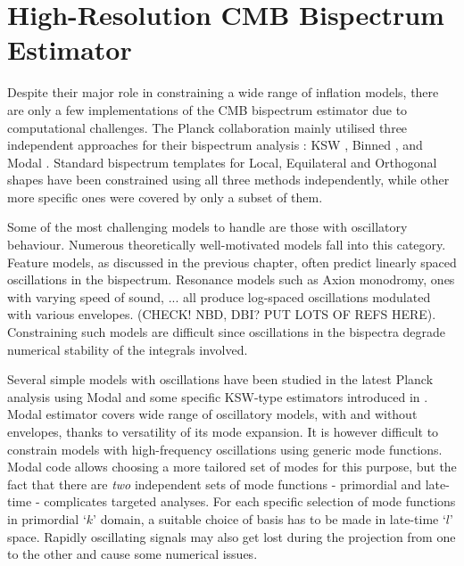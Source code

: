 \chapter{High-Resolution CMB Bispectrum Estimator}

\ifpdf
    \graphicspath{{Chapter5/Figs/Raster/}{Chapter5/Figs/PDF/}{Chapter5/Figs/}}
\else
    \graphicspath{{Chapter5/Figs/Vector/}{Chapter5/Figs/}}
\fi

Despite their major role in constraining a wide range of inflation models, there are only a few implementations of the CMB bispectrum estimator due to computational challenges. The Planck collaboration mainly utilised three independent approaches for their bispectrum analysis \cite{PlanckCollaboration2015,PlanckCollaboration2018}: KSW \cite{Komatsu2005}, Binned \cite{Bucher2010}, and Modal \cite{Fergusson2012}. Standard bispectrum templates for Local, Equilateral and Orthogonal shapes have been constrained using all three methods independently, while other more specific ones were covered by only a subset of them.

Some of the most challenging models to handle are those with oscillatory behaviour. Numerous theoretically well-motivated models fall into this category. Feature models, as discussed in the previous chapter, often predict linearly spaced oscillations in the bispectrum. Resonance models such as Axion monodromy, ones with varying speed of sound, ... all produce log-spaced oscillations modulated with various envelopes. (CHECK! NBD, DBI? PUT LOTS OF REFS HERE). Constraining such models are difficult since oscillations in the bispectra degrade numerical stability of the integrals involved.

Several simple models with oscillations have been studied in the latest Planck analysis using Modal and some specific KSW-type estimators introduced in \cite{Munchmeyer2014}. Modal estimator covers wide range of oscillatory models, with and without envelopes, thanks to versatility of its mode expansion. It is however difficult to constrain models with high-frequency oscillations using generic mode functions. Modal code allows choosing a more tailored set of modes for this purpose, but the fact that there are \textit{two} independent sets of mode functions - primordial and late-time - complicates targeted analyses. For each specific selection of mode functions in primordial `$k$' domain, a suitable choice of basis has to be made in late-time `$l$' space. Rapidly oscillating signals may also get lost during the projection from one to the other and cause some numerical issues.

